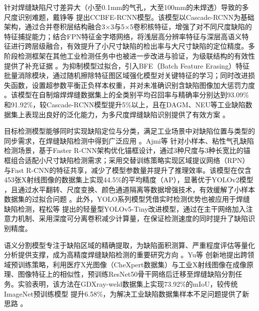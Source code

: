 \documentclass{cjlu_literature_review}
\begin{document}
		针对焊缝缺陷尺寸差异大（小至0.1mm的气孔，大至100mm的未焊透）导致的多尺度识别难题，戴铮等 \cite{Dai2025_CCBFERCNN, Cao2019_ImprovedFasterRCNN} 提出CCBFE-RCNN模型。该模型以Cascade-RCNN为基础架构，通过合并卷积层结构融合3×3与5×5卷积核特征，增强了对不同尺度缺陷的特征捕捉能力；结合FPN特征金字塔网络，将浅层高分辨率特征与深层高语义特征进行跨层级融合，有效提升了小尺寸缺陷的检出率与大尺寸缺陷的定位精度。多阶段检测框架在其他工业检测任务中也被进一步改进与验证，为级联结构的有效性提供了补充证据 \cite{Dong2023_ImprovedCascadeRCNN}。为抑制模型过拟合，引入BFE（Batch Feature Erasing）特征批量消除模块，通过随机擦除特征图区域强化模型对关键特征的学习；同时改进损失函数，设置超参数平衡正负样本权重，并对未准确识别含缺陷图像加大惩罚力度 \cite{Chen2022_ImprovedCrossEntropyLoss, Zhang2021_ModifiedYOLOv3}。该模型在自制熔焊焊缝数据集上的全类别平均召回率与精确率分别达到93.09\%和91.92\%，较Cascade-RCNN模型提升5\%以上，且在DAGM、NEU等工业缺陷数据集上表现出良好的泛化能力，为多尺度焊缝缺陷识别提供了有效方案 \cite{Wei2020_MultiTargetDefectYOLOv3, Zhang2021_ModifiedYOLOv3}。
	
		目标检测模型能够同时实现缺陷定位与分类，满足工业场景中对缺陷位置与类型的同步需求，在焊缝缺陷检测中得到广泛应用 \cite{Girshick2015_FastRCNN, Ren2017_FasterRCNN, Ajmi2023_FasterRCNNWeldDefects}。Ajmi等 \cite{Valavanis2010_MulticlassDefectDetection, Ajmi2023_FasterRCNNWeldDefects} 针对小样本、粘性气孔缺陷检测场景，基于Faster R-CNN架构优化锚框设计，通过3种尺度与3种长宽比的锚框组合适配小尺寸缺陷检测需求；采用交替训练策略实现区域提议网络（RPN）与Fast R-CNN的特征共享，减少了模型参数量并提升了推理效率。该模型在仅含453张X射线图像的数据集上实现44.5\%的平均精度（AP），显著优于YOLOv2模型 \cite{Redmon2015_YOLO}，且通过水平翻转、尺度变换、颜色通道隔离等数据增强技术，有效缓解了小样本数据集的过拟合问题 \cite{Valavanis2010_MulticlassDefectDetection, Kumar2014_TextureFeatureWeldFlaws}。此外，YOLO系列模型凭借实时检测优势也被应用于焊缝缺陷检测，程松等 \cite{Guo2021_ContrastEnhancementGAN, Cheng2022_YOLOv5Lightweight} 提出的轻量型YOLOv5-Tiny改进模型，通过在主干网络加入注意力机制、采用深度可分离卷积减少计算量，在保证检测速度的同时提升了缺陷识别精度。
	
	语义分割模型专注于缺陷区域的精确提取，为缺陷面积测算、严重程度评估等量化分析提供支撑，成为高精度焊缝缺陷检测的重要研究方向 \cite{Ronneberger2015_UNet, Yu2025_IndustrialDefectRecognition}。Yu等 \cite{Irvin2019_CheXpertDataset, Yu2025_IndustrialDefectRecognition} 创新地提出跨领域预训练策略，利用医疗X光图像（CheXpert数据集）与工业X射线图像在成像原理、图像特征上的相似性，预训练ResNet50骨干网络后迁移至焊缝缺陷分割任务。实验表明，该方法在GDXray-weld数据集上实现73.92\%的mIoU，较传统ImageNet预训练模型 \cite{Li2010_ImageNet} 提升6.58\%，为解决工业缺陷数据集样本不足问题提供了新思路 \cite{Mery2015_GDXrayDataset, Chen2018_EncoderDecoderSegmentation}。
	
\end{document}
